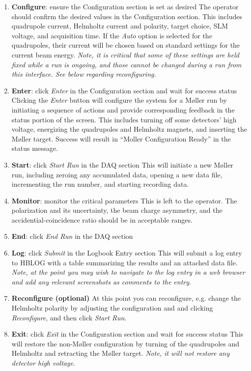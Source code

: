 \documentclass[amsmath,amssymb,notitlepage,11pt]{revtex4}
\begin{document}
\begin{enumerate}
\item {\bf Configure}:  ensure the Configuration section is set as desired
        \subitem
        The operator should confirm the desired values in the Configuration section.  This includes quadrupole current, Helmholtz current and polarity, target choice, SLM voltage, and acquisition time.  If the {\em Auto} option is selected for the quadrupoles, their current will be chosen based on standard settings for the current beam energy.  {\em Note, it is critical that some of these settings are held fixed while a run is ongoing, and those cannot be changed during a run from this interface.  See below regarding reconfiguring.}
\item {\bf Enter}: click {\em Enter} in the Configuration section and wait for success status
    \subitem Clicking the {\em Enter} button will configure the system for a M{\o}ller run by initiating a sequence of actions and provide corresponding feedback in the status portion of the screen.  This includes turning off some detectors' high voltage, energizing the quadrupoles and Helmholtz magnets, and inserting the M{\o}ller target.  Success will result in ``Moller Configuration Ready'' in the status message.
\item {\bf Start}: click {\em Start Run} in the DAQ section
    \subitem This will initiate a new M{\o}ller run, including zeroing any accumulated data, opening a new data file, incrementing the run number, and starting recording data.
\item {\bf Monitor}: monitor the critical parameters
    \subitem This is left to the operator.  The polarization and its uncertainty, the beam charge asymmetry, and the accidential-coincidence ratio should be in acceptable ranges.
\item {\bf End}: click {\em End Run} in the DAQ section
\item {\bf Log}: click {\em Submit} in the Logbook Entry section 
    \subitem This will submit a log entry to HBLOG with a table summarizing the results and an attached data file. {\em Note, at the point you may wish to navigate to the log entry in a web browser and add any relevant screenshots as comments to the entry}.
\item {\bf Reconfigure (optional)} At this point you can reconfigure, e.g. change the Helmholtz polarity by adjusting the configuration and and clicking {\em Reconfigure}, and then click {\em Start Run}.
\item {\bf Exit}: click {\em Exit} in the Configuration section and wait for success status
    \subitem  This will restore the non-M{\o}ller configuration by turning of the quadrupoles and Helmholtz and retracting the M{\o}ller target.  {\em Note, it will not restore any detector high voltage}. 
\end{enumerate}
\end{document}

